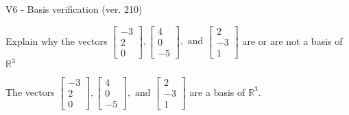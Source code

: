 \begin{exercise}
  \begin{exerciseTitle}V6 - Basis verification (ver. 210)\end{exerciseTitle}
  \begin{exerciseStatement}
    Explain why the vectors \(\left[\begin{array}{r}
-3 \\
2 \\
0
\end{array}\right] , \left[\begin{array}{r}
4 \\
0 \\
-5
\end{array}\right] , \text{ and } \left[\begin{array}{r}
2 \\
-3 \\
1
\end{array}\right]\) are or are not a basis of \(\mathbb{R}^3\)	


  \end{exerciseStatement}
  \begin{exerciseAnswer}
   The vectors \(\left[\begin{array}{r}
-3 \\
2 \\
0
\end{array}\right] , \left[\begin{array}{r}
4 \\
0 \\
-5
\end{array}\right] , \text{ and } \left[\begin{array}{r}
2 \\
-3 \\
1
\end{array}\right]\) 
  	 are  a basis of \(\mathbb{R}^3\).
  


  \end{exerciseAnswer}
\end{exercise}